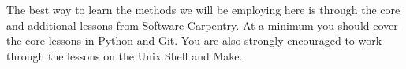 The best way to learn the methods we will be employing here is through the core and additional lessons from \href{https://software-carpentry.org/lessons/}{Software Carpentry}. At a minimum you should cover the core lessons in Python and Git. You are also strongly encouraged to work through the lessons on the Unix Shell and Make.







